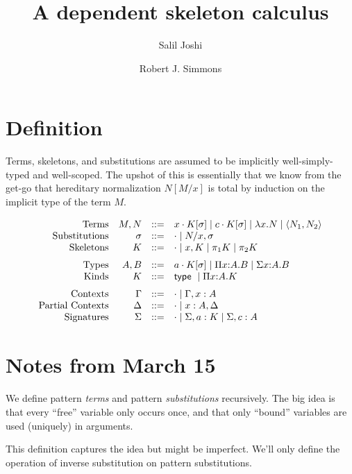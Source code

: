 \documentclass{article}
\begin{document}
\title{A dependent skeleton calculus}
\author{Salil Joshi \and Robert J. Simmons}
\maketitle

\section{Definition}

Terms, skeletons, and substitutions are assumed to be implicitly 
well-simply-typed and well-scoped. The upshot of this is essentially 
that we know from the get-go that hereditary normalization $N[M/x]$ is total 
by induction on the implicit type of the term $M$.

\[
\begin{array}{rrcl}
\mbox{Terms} & M, N & ::= & 
     x \cdot K [ \sigma ] 
\mid c \cdot K [ \sigma ]
\mid \lambda x. N
\mid \langle N_1 , N_2 \rangle 
\\
\mbox{Substitutions} & \sigma & ::= &
     \cdot 
\mid N/x, \sigma
\\
\mbox{Skeletons} & K & ::= &
     \cdot
\mid x, K
\mid \pi_1 K
\mid \pi_2 K
\medskip\\
\mbox{Types} & A,B & ::= &
     a \cdot K [ \sigma ]
\mid \Pi x{:}A.B
\mid \Sigma x{:}A.B
\\
\mbox{Kinds} & K & ::= &
     \mathsf{type} \
\mid \Pi x{:}A.K
\medskip\\
\mbox{Contexts} & \Gamma & ::= & 
     \cdot
\mid \Gamma, x : A
\\
\mbox{Partial Contexts} & \Delta & ::= &
     \cdot
\mid x : A, \Delta
\\
\mbox{Signatures} & \Sigma & ::= &
     \cdot
\mid \Sigma, a : K
\mid \Sigma, c : A
\\
\end{array}
\]

\section{Notes from March 15}

We define pattern {\it terms} and pattern {\it substitutions} recursively.
The big idea is that every ``free'' variable only occurs once, and that
only ``bound'' variables are used (uniquely) in arguments. 

This definition captures the idea but might be imperfect. We'll
only define the operation of inverse substitution on pattern substitutions.
\end{document}
